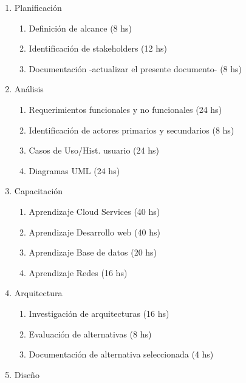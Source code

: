 \documentclass[11pt]{charter}
\begin{document}
\begin{consigna}

\begin{enumerate}

\item Planificación

        \begin{enumerate}
        \item Definición de alcance (8 hs)
        \item Identificación de stakeholders (12 hs)
        \item Documentación -actualizar el presente documento- (8 hs)
        \end{enumerate}

\item Análisis

        \begin{enumerate}
        \item Requerimientos funcionales y no funcionales (24 hs)
        \item Identificación de actores primarios y secundarios (8 hs)
        \item Casos de Uso/Hist. usuario (24 hs)
        \item Diagramas UML (24 hs)
        \end{enumerate}

\item Capacitación

        \begin{enumerate}
        \item Aprendizaje Cloud Services (40 hs)
        \item Aprendizaje Desarrollo web  (40 hs)
        \item Aprendizaje Base de datos  (20 hs)
        \item Aprendizaje Redes  (16 hs)
        \end{enumerate}

\item Arquitectura

        \begin{enumerate}
        \item Investigación de arquitecturas (16 hs)
        \item Evaluación de alternativas (8 hs)
        \item Documentación de alternativa seleccionada (4 hs)
        \end{enumerate}

\item Diseño


\end{enumerate}
\end{consigna}
\end{document}
